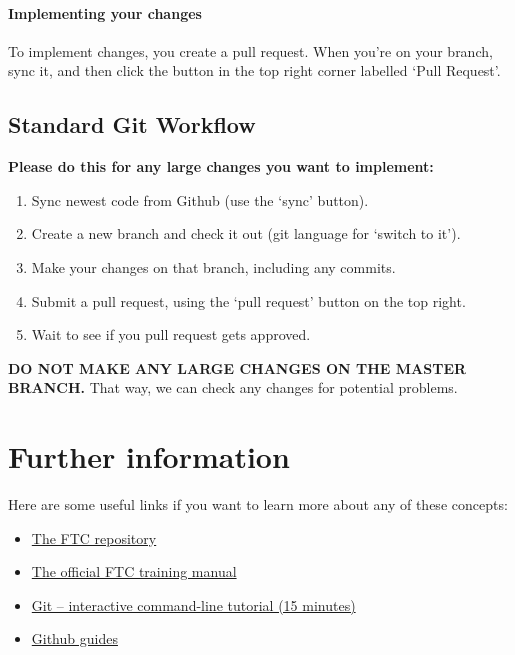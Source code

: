 \documentclass[12p,a4paper]{article}
\begin{document}
\paragraph{Implementing your changes}To implement changes, you create a pull request. When you're on your branch, sync it, and then click the button in the top right corner labelled `Pull Request'.

\subsection{Standard Git Workflow}
\textbf{Please do this for any large changes you want to implement:}
\begin{enumerate}
\item{Sync newest code from Github (use the `sync' button).}
\item{Create a new branch and check it out (git language for `switch to it').}
\item{Make your changes on that branch, including any commits.}
\item{Submit a pull request, using the `pull request' button on the top right.}
\item{Wait to see if you pull request gets approved.}
\end{enumerate}
\textbf{DO NOT MAKE ANY LARGE CHANGES ON THE MASTER BRANCH.} That way, we can check any changes for potential problems.
\section{Further information}
Here are some useful links if you want to learn more about any of these concepts:
\begin{itemize}
\item{\href{https://github.com/ftctechnh/ftc_app}{The FTC repository}}
\item{\href{https://github.com/ftctechnh/ftc_app/blob/master/doc/tutorial/FTCTraining_Manual.pdf}{The official FTC training manual}}
\item{\href{https://try.github.io/}{Git -- interactive command-line tutorial (15 minutes)}}
\item{\href{https://guides.github.com}{Github guides}}
\end{itemize}
\end{document}
